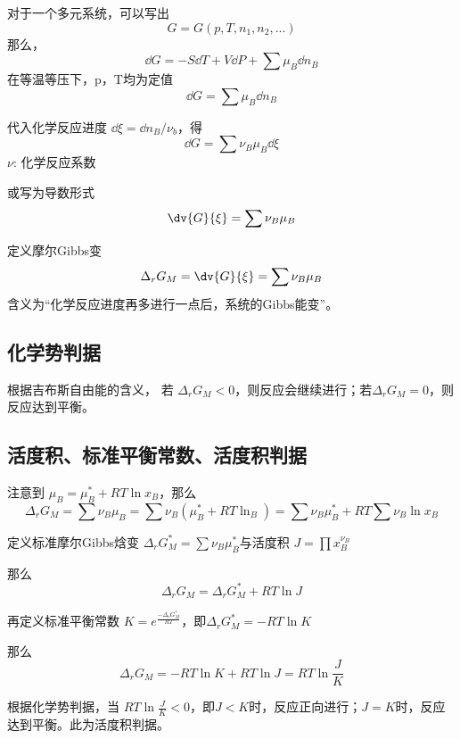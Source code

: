 
\begin{issues}
\issueDraft
\end{issues}


对于一个多元系统，可以写出
\begin{equation}
G=G(p,T,n_1,n_2,...)
\end{equation}
那么，
\begin{equation}
\dd G=-S \dd T +V \dd P + \sum \mu_B \dd n_B
\end{equation}
在等温等压下，p，T均为定值
\begin{equation}
\dd G=\sum \mu_B \dd n_B
\end{equation}

代入化学反应进度 $\dd \xi=\dd n_B/\nu_b$，得
\begin{equation}
\dd G=\sum \nu_B \mu_B \dd \xi
\end{equation}
$\nu$: 化学反应系数

或写为导数形式
\begin{equation}
\dv{G}{\xi}=\sum \nu_B \mu_B
\end{equation}

定义摩尔Gibbs变
\begin{equation}
\Delta _r G_M = \dv{G}{\xi}=\sum \nu_B \mu_B
\end{equation}
含义为“化学反应进度再多进行一点后，系统的Gibbs能变”。

\subsection{化学势判据}
根据吉布斯自由能的含义，
若 $\Delta _r G_M<0$，则反应会继续进行；若$\Delta _r G_M = 0$，则反应达到平衡。

\subsection{活度积、标准平衡常数、活度积判据}
注意到 
$\mu_B=\mu_B^*+RT \ln x_B$，那么
\begin{equation} \label{chemBl_eq1}
\Delta _r G_M =\sum \nu_B \mu_B = \sum \nu_B (\mu_B^*+RT\ln _B)=\sum \nu_B \mu_B^* + RT \sum \nu_B \ln x_B
\end{equation}

定义标准摩尔Gibbs焓变 $\Delta _r G_M^*=\sum \nu_B \mu_B^*$与活度积 $J=\prod x_B^{\nu_B}$

那么
\begin{equation}
\Delta _r G_M = \Delta _r G_M^* + RT \ln J
\end{equation}

再定义标准平衡常数 $K = e^{\frac{-\Delta _r G_M^*}{RT}}$，即$\Delta _r G_M^* = -RT \ln K$

那么 
\begin{equation}
\Delta _r G_M = -RT \ln K + RT \ln J = RT \ln \frac{J}{K}
\end{equation}

根据化学势判据，当 
$RT \ln \frac{J}{K} < 0$，即$J<K$时，反应正向进行；$J=K$时，反应达到平衡。此为活度积判据。